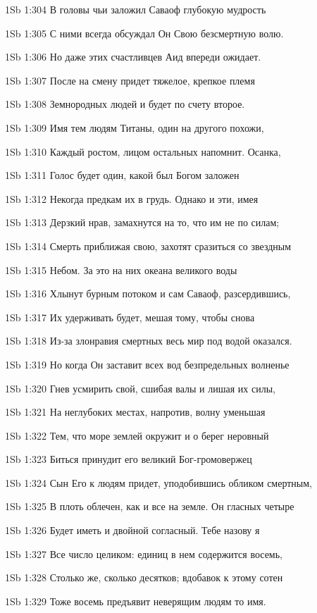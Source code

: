 \vs 1Sb 1:304 В головы чьи заложил Саваоф глубокую мудрость 

\vs 1Sb 1:305 С ними всегда обсуждал Он Свою безсмертную волю.

\vs 1Sb 1:306 Но даже этих счастливцев Аид впереди ожидает.

\vs 1Sb 1:307 После на смену придет тяжелое, крепкое племя

\vs 1Sb 1:308 Земнородных людей и будет по счету второе.

\vs 1Sb 1:309 Имя тем людям Титаны, один на другого похожи,

\vs 1Sb 1:310 Каждый ростом, лицом остальных напомнит. Осанка,

\vs 1Sb 1:311 Голос будет один, какой был Богом заложен

\vs 1Sb 1:312 Некогда предкам их в грудь. Однако и эти, имея

\vs 1Sb 1:313 Дерзкий нрав, замахнутся на то, что им не по силам;

\vs 1Sb 1:314 Смерть приближая свою, захотят сразиться со звездным

\vs 1Sb 1:315 Небом. За это на них океана великого воды

\vs 1Sb 1:316 Хлынут бурным потоком  и сам Саваоф, разсердившись,

\vs 1Sb 1:317 Их удерживать будет, мешая тому, чтобы снова

\vs 1Sb 1:318 Из-за злонравия смертных весь мир под водой оказался.

\vs 1Sb 1:319 Но когда Он заставит всех вод безпредельных волненье

\vs 1Sb 1:320 Гнев усмирить свой, сшибая валы и лишая их силы,

\vs 1Sb 1:321 На неглубоких местах, напротив, волну уменьшая

\vs 1Sb 1:322 Тем, что море землей окружит и о берег неровный

\vs 1Sb 1:323 Биться принудит его великий Бог-громовержец

\vs 1Sb 1:324 Сын Его к людям придет, уподобившись обликом смертным,

\vs 1Sb 1:325 В плоть облечен, как и все на земле. Он гласных четыре

\vs 1Sb 1:326 Будет иметь и двойной согласный. Тебе назову я

\vs 1Sb 1:327 Все число целиком: единиц в нем содержится восемь,

\vs 1Sb 1:328 Столько же, сколько десятков; вдобавок к этому сотен

\vs 1Sb 1:329 Тоже восемь предъявит неверящим людям то имя.

